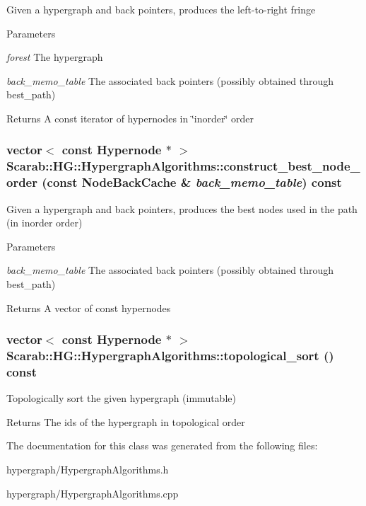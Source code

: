 \label{class_scarab_1_1_h_g_1_1_hypergraph_algorithms_af5bcb325e1d58dd9d4c26517c4dfeca0}
Given a hypergraph and back pointers, produces the left-\/to-\/right fringe 
\begin{DoxyParams}{Parameters}
\item[{\em forest}]The hypergraph \item[{\em back\_\-memo\_\-table}]The associated back pointers (possibly obtained through best\_\-path) \end{DoxyParams}
\begin{DoxyReturn}{Returns}
A const iterator of hypernodes in \char`\"{}inorder\char`\"{} order 
\end{DoxyReturn}
\hypertarget{class_scarab_1_1_h_g_1_1_hypergraph_algorithms_acf3eea6f89752404f12c0a3dd45d397d}{
\subsubsection[{construct\_\-best\_\-node\_\-order}]{\setlength{\rightskip}{0pt plus 5cm}vector$<$ const {\bf Hypernode} $\ast$ $>$ Scarab::HG::HypergraphAlgorithms::construct\_\-best\_\-node\_\-order (const {\bf NodeBackCache} \& {\em back\_\-memo\_\-table}) const}}
\label{class_scarab_1_1_h_g_1_1_hypergraph_algorithms_acf3eea6f89752404f12c0a3dd45d397d}
Given a hypergraph and back pointers, produces the best nodes used in the path (in inorder order)


\begin{DoxyParams}{Parameters}
\item[{\em back\_\-memo\_\-table}]The associated back pointers (possibly obtained through best\_\-path) \end{DoxyParams}
\begin{DoxyReturn}{Returns}
A vector of const hypernodes 
\end{DoxyReturn}
\hypertarget{class_scarab_1_1_h_g_1_1_hypergraph_algorithms_afeb33bac104955747948b3d4a885cdc4}{
\subsubsection[{topological\_\-sort}]{\setlength{\rightskip}{0pt plus 5cm}vector$<$ const {\bf Hypernode} $\ast$ $>$ Scarab::HG::HypergraphAlgorithms::topological\_\-sort () const}}
\label{class_scarab_1_1_h_g_1_1_hypergraph_algorithms_afeb33bac104955747948b3d4a885cdc4}
Topologically sort the given hypergraph (immutable) \begin{DoxyReturn}{Returns}
The ids of the hypergraph in topological order 
\end{DoxyReturn}


The documentation for this class was generated from the following files:\begin{DoxyCompactItemize}
\item 
hypergraph/HypergraphAlgorithms.h\item 
hypergraph/HypergraphAlgorithms.cpp\end{DoxyCompactItemize}
